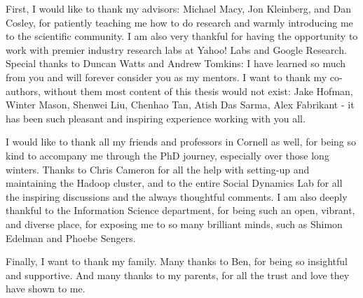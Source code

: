 \documentclass[phd,tocprelim]{cornell}
\begin{document}

\begin{acknowledgements}
First, I would like to thank my advisors: Michael Macy, Jon Kleinberg, and Dan Cosley, for patiently teaching me how to do research and warmly introducing me to the scientific community. I am also very thankful for having the opportunity to work with premier industry research labs at Yahoo! Labs and Google Research. Special thanks to Duncan Watts and Andrew Tomkins: I have learned so much from you and will forever consider you as my mentors. I want to thank my co-authors, without them most content of this thesis would not exist: Jake Hofman, Winter Mason, Shenwei Liu, Chenhao Tan, Atish Das Sarma, Alex Fabrikant - it has been such pleasant and inspiring experience working with you all.


I would like to thank all my friends and professors in Cornell as well, for being so kind to accompany me through the PhD journey, especially over those long winters. Thanks to Chris Cameron for all the help with setting-up and maintaining the Hadoop cluster, and to the entire Social Dynamics Lab for all the inspiring discussions and the always thoughtful comments. I am also deeply thankful to the Information Science department, for being such an open, vibrant, and diverse place, for exposing me to so many brilliant minds, such as Shimon Edelman and Phoebe Sengers. 

Finally, I want to thank my family. Many thanks to Ben, for being so insightful and supportive. And many thanks to my parents, for all the trust and love they have shown to me.





\end{acknowledgements}
\end{document}
